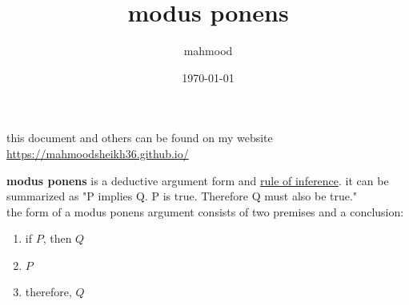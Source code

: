 \documentclass[a4paper,12pt]{article}
\author{mahmood}
\date{\today}
\title{modus ponens}
\begin{document}
\maketitle
\begin{note}
this document and others can be found on my website\\
\url{https://mahmoodsheikh36.github.io/}
\end{note}
\textbf{modus ponens} is a deductive argument form and \href{20230524202636-rule_of_inference.org}{rule of inference}. it can be summarized as "P implies Q. P is true. Therefore Q must also be true."\\[0pt]
the form of a modus ponens argument consists of two premises and a conclusion:\\[0pt]
\begin{enumerate}
\item if \(P\), then \(Q\)\\[0pt]
\item \(P\)\\[0pt]
\item therefore, \(Q\)
\end{enumerate}
\end{document}
